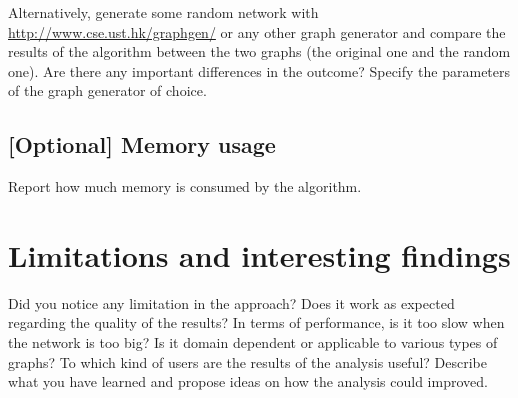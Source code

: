 \documentclass[11pt,a4paper,onecolumn,notitlepage]{article}
\begin{document}
\smallskip
\noindent Alternatively, generate some random network with \url{http://www.cse.ust.hk/graphgen/} or any other graph generator and compare the results of the algorithm between the two graphs (the original one and the random one). Are there any important differences in the outcome? Specify the parameters of the graph generator of choice. 


\subsection{[Optional] Memory usage}
Report how much memory is consumed by the algorithm. 


\section{Limitations and interesting findings}

Did you notice any limitation in the approach? Does it work as expected regarding the quality of the results? In terms of performance, is it too slow when the network is too big? Is it domain dependent or applicable to various types of graphs? To which kind of users are the results of the analysis useful? Describe what you have learned and propose ideas on how the analysis could improved. 




  
\end{document}
